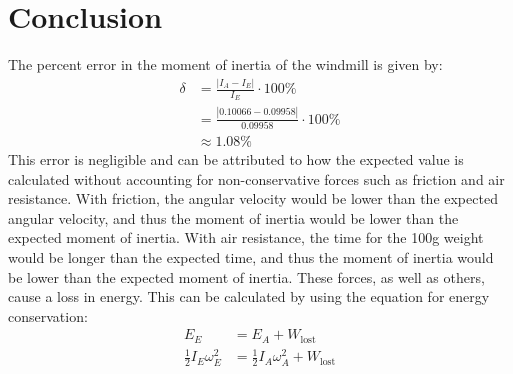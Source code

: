 \documentclass[article, 11pt]{article}
\begin{document}
    \section{Conclusion}
    \noindent
    The percent error in the moment of inertia of the windmill is given by:
    \begin{align*}
        \delta &= \frac{|I_A - I_E|}{I_E} \cdot 100\% \\
            &= \frac{|0.10066 - 0.09958|}{0.09958} \cdot 100\% \\
            &\approx 1.08\% 
    \end{align*}
    This error is negligible and can be attributed to how the expected value is calculated without accounting for non-conservative forces such as friction and air resistance. With friction, the angular velocity would be lower than the expected angular velocity, and thus the moment of inertia would be lower than the expected moment of inertia. With air resistance, the time for the 100g weight would be longer than the expected time, and thus the moment of inertia would be lower than the expected moment of inertia. These forces, as well as others, cause a loss in energy. This can be calculated by using the equation for energy conservation:
    \begin{align*}
        E_E                      &= E_A + W_\text{lost} \\
        \frac{1}{2}I_E\omega_E^2 &= \frac{1}{2}I_A\omega_A^2 + W_\text{lost} \\
    \end{align*}
\end{document}
